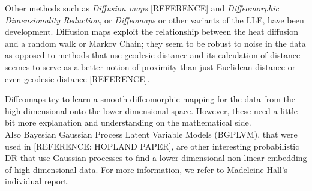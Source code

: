 Other methods such as \textit{Diffusion maps} [REFERENCE] and \textit{Diffeomorphic Dimensionality Reduction}, or \textit{Diffeomaps} or other variants of the LLE, have been development. 
Diffusion maps exploit the relationship between the heat diffusion and a random walk or Markov Chain; 
they seem to be robust to noise in the data as opposed to methods that use geodesic distance and its calculation of distance seemes to serve as a better notion of proximity than just Euclidean distance or even geodesic distance [REFERENCE].

Diffeomaps try to learn a smooth diffeomorphic mapping for the data from the high-dimensional onto the lower-dimensional space. However, these need a little bit more explanation and understanding on the mathematical side. \\

Also Bayesian Gaussian Process Latent Variable Models (BGPLVM), that were used in [REFERENCE: HOPLAND PAPER], are other interesting probabilistic DR that use Gaussian processes to find a lower-dimensional non-linear embedding of high-dimensional data. For more information, we refer to Madeleine Hall's individual report.




